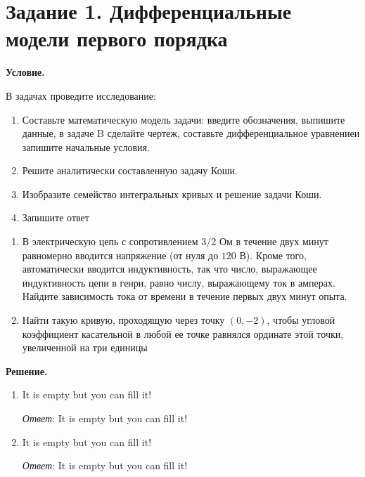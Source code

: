 \section{Задание 1. Дифференциальные модели первого порядка}

\textbf{Условие.}

В задачах проведите исследование:

\begin{enumerate}
    \item Составьте математическую модель задачи: введите обозначения, выпишите данные, в задаче B сделайте чертеж, составьте дифференциальное уравнениеи запишите начальные условия.
    \item Решите аналитически составленную задачу Коши.
    \item Изобразите семейство интегральных кривых и решение задачи Коши.
    \item Запишите ответ
\end{enumerate}

\begin{enumerate}[label=\Alph*.]
    \item В электрическую цепь с сопротивлением $3/2$ Ом в течение двух минут равномерно вводится напряжение (от нуля до $120$ В).
    Кроме того, автоматически вводится индуктивность, так что число, выражающее индуктивность цепи в генри, равно числу,
    выражающему ток в амперах.
    Найдите зависимость тока от времени в течение первых двух минут опыта.

    \item Найти такую кривую, проходящую через точку $(0, -2)$, чтобы угловой коэффициент касательной в любой ее точке равнялся
    ординате этой точки, увеличенной на три единицы
\end{enumerate}

\vspace{10mm}
\textbf{Решение.}

\begin{enumerate}[label=\Alph*.]
    \item It is empty but you can fill it!

    \textit{Ответ}: It is empty but you can fill it!

    \vspace{10mm}

    \item It is empty but you can fill it!

    \textit{Ответ}: It is empty but you can fill it!
\end{enumerate}


